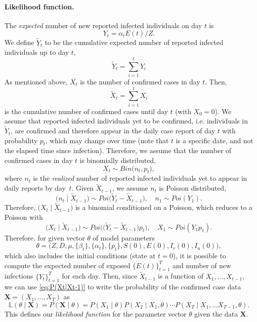 \documentclass[12pt]{extarticle}
\let\vec\mathbf
\begin{document}
\paragraph*{Likelihood function.}
The \emph{expected} number of new reported infected individuals on day $t$ is 
$$
Y_t=\alpha_t E(t)/Z.
$$
We define $\tilde{Y}_t$ to be the cumulative expected number of reported infected individuals up to day $t$,
$$
\tilde{Y}_t = \sum_{i=1}^{t}{Y_i}
$$
As mentioned above, $X_t$ is the number of confirmed cases in day $t$. Then, 
$$
\tilde{X}_t=\sum_{i=1}^{t}X_i
$$
is the cumulative number of confirmed cases until day $t$ (with $X_0=0$).
We assume that reported infected individuals yet to be confirmed, i.e. individuals in $\tilde{Y}_t$, are confirmed and therefore appear in the daily case report of day $t$ with probability $p_t$, which may change over time (note that $t$ is a specific date, and not the elapsed time since infection).
Therefore, we assume that the number of confirmed cases in day $t$ is binomially distributed,
$$
X_t \sim \mathit{Bin}\big(n_t, p_t\big),
$$
where $n_t$ is the \emph{realized} number of reported infected individuals yet to appear in daily reports by day~$t$.
Given $\tilde{X}_{t-1}$, we assume $n_t$ is Poisson distributed,
$$
\big(n_t \mid \tilde{X}_{t-1}\big) \sim \mathit{Poi}\Big( \tilde{Y}_t - \tilde{X}_{t-1} \Big), \quad n_1 \sim \mathit{Poi}(Y_1).
$$ 
Therefore, $\big(X_t \mid \tilde{X}_{t-1} \big)$ is a binomial conditioned on a Poisson, which reduces to a Poisson with
\begin{equation} \label{eq:P(Xt|Xt-1)}
\big(X_t \mid \tilde{X}_{t-1} \big) \sim \mathit{Poi}\Big( \big( \tilde{Y}_t - \tilde{X}_{t-1} \big)p_t \Big), \quad X_1 \sim \mathit{Poi}(Y_1 p_1).
\end{equation}
Therefore, for given vector $\theta$ of model parameters 
$$
\theta=\Big(Z, D, \mu, \{\beta_t\}, \{\alpha_t\}, \{p_t\}, S(0), E(0), I_r(0), I_u(0)\Big),
$$ %
which also includes the initial conditions (state at $t=0$), it is possible to compute the expected number of exposed $\{E(t)\}_{t=1}^{T}$ and number of new infections $\{Y_t\}_{t=1}^{T}$ for each day. Then, since $\tilde{X}_{t-1}$ is a function of $X_1, \ldots, X_{t-1}$, we can use \autoref{eq:P(Xt|Xt-1)} to write the probability of the confirmed case data $\vec{X} = (X_1, \ldots, X_T)$ as 
\begin{equation} \label{eq:likelihood}
\mathbb{L}(\theta \mid \vec{X}) = P(\vec{X} \mid \theta) = P(X_1 \mid \theta) P(X_2 \mid X_1, \theta) \cdots P(X_T \mid X_1, \ldots X_{T-1}, \theta).
\end{equation}
This defines our \emph{likelihood function} for the parameter vector $\theta$ given the data $\vec{X}$.
\end{document}
